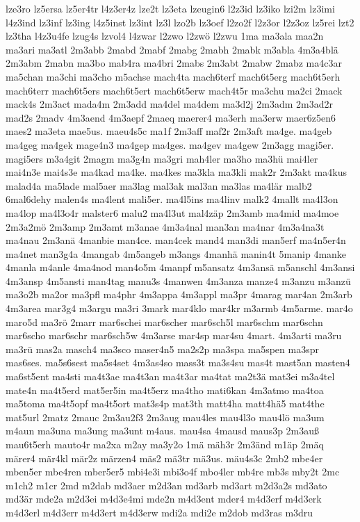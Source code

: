 {lze3ro
lz5ersa
lz5er4tr
l4z3er4z
lze2t
lz3eta
lzeugin6
l2z3id
lz3iko
lzi2m
lz3imi
l4z3ind
lz3inf
lz3ing
l4z5inst
lz3int
lz3l
lzo2b
lz3oef
l2zo2f
l2z3or
l2z3oz
lz5rei
lzt2
lz3tha
l4z3u4fe
lzug4s
lzvol4
l4zwar
l2zwo
l2zwö
l2zwu
1ma
ma3ala
maa2n
ma3ari
ma3atl
2m3abb
2mabd
2mabf
2mabg
2mabh
2mabk
m3abla
4m3a4blä
2m3abm
2mabn
ma3bo
mab4ra
ma4bri
2mabs
2m3abt
2mabw
2mabz
ma4c3ar
ma5chan
ma3chi
ma3cho
m5achse
mach4ta
mach6terf
mach6t5erg
mach6t5erh
mach6terr
mach6t5ers
mach6t5ert
mach6t5erw
mach4t5r
ma3chu
ma2ci
2mack
mack4s
2m3act
mada4m
2m3add
ma4del
ma4dem
ma3d2j
2m3adm
2m3ad2r
mad2s
2madv
4m3aend
4m3aepf
2maeq
maerer4
ma3erh
ma3erw
maer6z5en6
maes2
ma3eta
mae5us.
maeu4s5c
ma1f
2m3aff
maf2r
2m3aft
ma4ge.
ma4geb
ma4geg
ma4gek
mage4n3
ma4gep
ma4ges.
ma4gev
ma4gew
2m3agg
magi5er.
magi5ers
m3a4git
2magm
ma3g4n
ma3gri
mah4ler
ma3ho
ma3hü
mai4ler
mai4n3e
mai4s3e
ma4kad
ma4ke.
ma4kes
ma3kla
ma3kli
mak2r
2m3akt
ma4kus
malad4a
ma5lade
mal5aer
ma3lag
mal3ak
mal3an
ma3las
ma4lär
malb2
6mal6dehy
malen4s
ma4lent
mali5er.
ma4l5ins
ma4linv
malk2
4mallt
ma4l3on
ma4lop
ma4l3o4r
malster6
malu2
ma4l3ut
mal4zäp
2m3amb
ma4mid
ma4moe
2m3a2mö
2m3amp
2m3amt
m3anae
4m3a4nal
man3an
ma4nar
4m3a4na3t
ma4nau
2m3anä
4manbie
man4ce.
man4cek
mand4
man3di
man5erf
ma4n5er4n
ma4net
man3g4a
4mangab
4m5angeb
m3angs
4manhä
manin4t
5manip
4manke
4manla
m4anle
4ma4nod
man4o5m
4manpf
m5ansatz
4m3ansä
m5anschl
4m3ansi
4m3ansp
4m5ansti
man4tag
manu3s
4manwen
4m3anza
manze4
m3anzu
m3anzü
ma3o2b
ma2or
ma3pfl
ma4phr
4m3appa
4m3appl
ma3pr
4marag
mar4an
2m3arb
4m3area
mar3g4
m3argu
ma3ri
3mark
mar4klo
mar4kr
m3armb
4m5arme.
mar4o
maro5d
ma3rö
2marr
mar6schei
mar6scher
mar6sch5l
mar6schm
mar6schn
mar6scho
mar6schr
mar6sch5w
4m3arse
mar4sp
mar4su
4mart.
4m3arti
ma3ru
ma3rü
mas2a
masch4
ma3sco
maser4n5
ma2s2p
ma3spa
ma5spen
ma3spr
mas6ses.
ma5s6sest
ma5s4set
4m3as4so
mass3t
ma3s4su
mas4t
mast5an
masten4
ma6st5ent
ma4sti
ma4t3ae
ma4t3an
ma4t3ar
ma4tat
ma2t3ä
mat3ei
m3a4tel
mate4n
ma4t5erd
mat5er5in
ma4t5erz
ma4tho
mati6kan
4m3atmo
ma4toa
ma5toma
ma4t5opf
ma4t5ort
mat3s4p
mat3th
matt4ha
matt4hä5
mat4the
mat5url
2matz
2mauc
2m3au2f3
2m3aug
mau4les
mau4l3o
mau4lö
ma3um
m4aun
ma3una
ma3ung
ma3unt
m4aus.
mau4sa
4mausd
maus3p
2m3auß
mau6t5erh
mauto4r
ma2xa
m2ay
ma3y2o
1mä
mäh3r
2m3änd
m1äp
2mäq
märer4
mär4kl
mär2z
märzen4
mäs2
mä3tr
mä3us.
mäu4s3c
2mb2
mbe4er
mben5er
mbe4ren
mber5er5
mbi4e3i
mbi3o4f
mbo4ler
mb4re
mb3s
mby2t
2mc
m1ch2
m1cr
2md
m2dab
md3aer
m2d3an
md3arb
md3art
m2d3a2s
md3ato
md3är
mde2a
m2d3ei
m4d3e4mi
mde2n
m4d3ent
mder4
m4d3erf
m4d3erk
m4d3erl
m4d3err
m4d3ert
m4d3erw
mdi2a
mdi2e
m2dob
md3ras
m3dru
}
